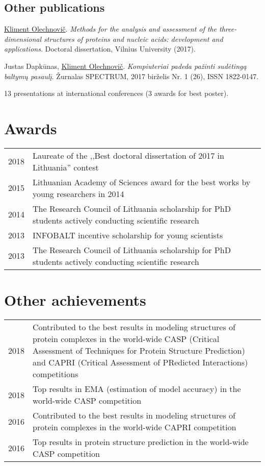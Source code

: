 \documentclass{article}
\newenvironment{itemize_tight}{
\begin{itemize}
  \setlength{\itemsep}{2pt}
  \setlength{\parskip}{0pt}
  \setlength{\parsep}{0pt}
}{\end{itemize}}
\begin{document}
\subsection*{Other publications}
\begin{itemize_tight}
  \item \underline{Kliment Olechnovič}.
        \emph{Methods for the analysis and assessment of the three-dimensional structures of proteins and nucleic acids: development and applications}.
        Doctoral dissertation, Vilnius University (2017).
  \item Justas Dapkūnas, \underline{Kliment Olechnovič}.
        \emph{Kompiuteriai padeda pažinti sudėtingą baltymų pasaulį}.
        Žurnalas SPECTRUM, 2017 birželis Nr. 1 (26), ISSN 1822-0147.
  \item 13 presentations at international conferences (3 awards for best poster).
\end{itemize_tight}


\section*{Awards}
\begin{tabular}{p{}p{}}
2018 & Laureate of the ,,Best doctoral dissertation of 2017 in Lithuania'' contest \\
2015 & Lithuanian Academy of Sciences award for the best works by young researchers in 2014 \\
2014 & The Research Council of Lithuania scholarship for PhD students actively conducting scientific research \\
2013 & INFOBALT incentive scholarship for young scientists \\
2013 & The Research Council of Lithuania scholarship for PhD students actively conducting scientific research
\end{tabular}


\section*{Other achievements}
\begin{tabular}{p{}p{}}
2018 & Contributed to the best results in modeling structures of protein complexes
       in the world-wide CASP (Critical Assessment of Techniques for Protein Structure Prediction)
       and CAPRI (Critical Assessment of PRedicted Interactions) competitions \\
2018 & Top results in EMA (estimation of model accuracy)
       in the world-wide CASP competition \\
2016 & Contributed to the best results in modeling structures of protein complexes
       in the world-wide CAPRI competition \\
2016 & Top results in protein structure prediction
       in the world-wide CASP competition
\end{tabular}
\end{document}
